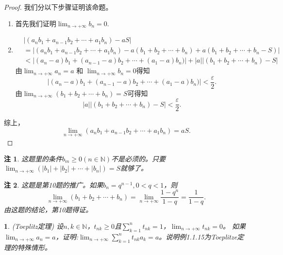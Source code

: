 \documentclass[utf8]{book}
\newtheorem{example}{}[section]             %
\newtheorem{remark}{注}
\begin{document}
\begin{proof}
我们分以下步骤证明该命题。
\begin{enumerate}
\renewcommand\labelenumi{\normalfont(\theenumi)}
\item 首先我们证明$\displaystyle \lim_{n\to +\infty}b_n = 0$.
\item 
\begin{equation*}
\begin{split}
&\left | (a_nb_1+a_{n-1}b_2+\cdots+a_1b_n) - aS \right | \\
&= \left | (a_nb_1+a_{n-1}b_2+\cdots+a_1b_n) - a(b_1+b_2+\cdots+b_n)+a(b_1+b_2+\cdots+b_n -S)\right| \\
&< \left | (a_n-a)b_1+(a_{n-1}-a)b_2+\cdots+(a_1-a)b_n)\right| + \left|a\right|\left|(b_1 + b_2+\cdots + b_n) -S\right|
\end{split}
\end{equation*}
由$\displaystyle \lim_{n\to +\infty}a_n = a$ 和 $\displaystyle \lim_{n\to +\infty}b_n = 0$得知
$$\left | (a_n-a)b_1+(a_{n-1}-a)b_2+\cdots+(a_1-a)b_n)\right| < \frac{\varepsilon}{2}.$$
由$\displaystyle \lim_{n\to +\infty}(b_1+b_2+\cdots+b_n) = S$可得知
$$\left|a\right|\left|(b_1 + b_2+\cdots + b_n) -S\right| < \frac{\varepsilon}{2}.$$
\end{enumerate}
综上，$$\displaystyle \lim_{n\to +\infty}(a_nb_1+a_{n-1}b_2+\cdots+a_1b_n) = aS.$$
\end{proof}
\begin{remark}
这题里的条件$b_m \geq 0 (n\in\mathbb{N})$不是必须的。只要$\displaystyle \lim_{n\to +\infty}(|b_1|+|b_2|+\cdots+|b_n|) = S$就够了。
\end{remark}
\begin{remark}
这题是第10题的推广。如果$b_n = q^{n-1}, 0 < q < 1$，则
$$\displaystyle \lim_{n\to +\infty}(b_1 + b_2 + \cdots + b_n) = \lim_{n\to +\infty}\frac{1-q^n}{1-q}=\frac{1}{1-q}.$$ 
由这题的结论，第10题得证。
\end{remark}
\begin{example}
(Toeplitz定理) 设$n,k\in\mathbb{N}$，$t_{nk} \geq 0$且$\displaystyle\sum_{k=1}^nt_{nk}=1$，$\displaystyle \lim_{n\to +\infty}t_{nk} = 0$。
如果$\displaystyle \lim_{n\to +\infty}a_n = a$，证明:$\displaystyle \lim_{n\to +\infty}\sum_{k=1}^nt_{nk}a_k = a$。说明例1.1.15为Toeplitze定理的特殊情形。
\end{example}
\end{document}
